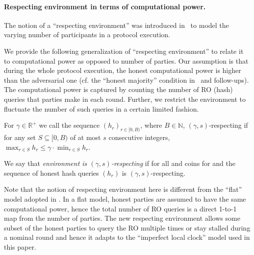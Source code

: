 \paragraph{Respecting environment in terms of computational power.}
%
The notion of a ``respecting environment'' was introduced in~\cite{C:GarKiaLeo17} to model the varying number of participants in a protocol execution.

We provide the following generalization of ``respecting environment'' to relate it to computational power as opposed to number of parties.
%
Our assumption is that during the whole protocol execution, the honest computational power is higher than the adversarial one (cf. the ``honest majority'' condition in~\cite{EC:GarKiaLeo15} and follow-ups).
%
The computational power is captured by counting the number of RO (hash) queries that parties make in each round.
%
Further, we restrict the environment to fluctuate the number of such queries in a certain limited fashion.

\begin{definition} \label{def:respecting-env}
    For $\gamma \in \mathbb{R}^+$ we call the sequence $(h_r)_{r \in [0, B)}$, where $B \in \mathbb{N}$, $(\gamma, s)$-respecting if for any set $S \subseteq [0, B)$ of at most $s$ consecutive integers, $\max_{r \in S} h_r \le \gamma \cdot \min_{r \in S} h_r$.
\end{definition}

We say that \emph{environment \Z is $(\gamma, s)$-respecting} if for all \adv and coins for \Z and \adv the sequence of honest hash queries $(h_r)$ is $(\gamma, s)$-respecting.

Note that the notion of respecting environment here is different from the ``flat'' model adopted in \cite{EC:GarKiaLeo15,C:GarKiaLeo17,EPRINT:GarKiaLeo20,C:BMTZ17}.
%
In a flat model, honest parties are assumed to have the same computational power, hence the total number of RO queries is a direct 1-to-1 map from the number of parties.
%
The new respecting environment allows some subset of the honest parties to query the RO multiple times or stay stalled during a nominal round and hence it adapts to the ``imperfect local clock'' model used in this paper.
